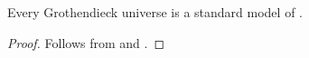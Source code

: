 \begin{corollary}\label{thm:grothendieck_universe_is_model_of_zfc}
  Every Grothendieck universe is a standard model of \hyperref[def:zfc]{}.
\end{corollary}
\begin{proof}
  Follows from  and .
\end{proof}
